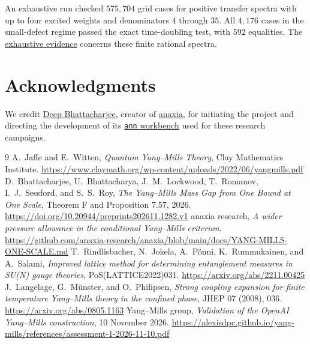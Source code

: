 \documentclass[11pt]{amsart}
\begin{document}
An exhaustive run checked \(575{,}704\) grid cases for positive transfer
spectra with up to four excited weights and denominators \(4\) through \(35\).
All \(4{,}176\) cases in the small-defect regime passed the exact
time-doubling test, with \(592\) equalities. The
\href{https://github.com/anaxia-research/anaxia/blob/main/research/weak-coupling-seams/exhaustive-evidence.json}{exhaustive evidence}
concerns these finite rational spectra.

\section*{Acknowledgments}

We credit \href{https://github.com/creelie}{Deep Bhattacharjee}, creator of
\href{https://github.com/anaxia-research/anaxia}{anaxia}, for initiating the project and directing the development
of its \href{https://github.com/anaxia-research/anaxia/tree/main/anaxia/ann}{\texttt{ann} workbench}
used for these research campaigns.

\begin{thebibliography}{9}
 A.~Jaffe and E.~Witten, \emph{Quantum Yang--Mills Theory},
Clay Mathematics Institute. \url{https://www.claymath.org/wp-content/uploads/2022/06/yangmills.pdf}
 D.~Bhattacharjee, U.~Bhattacharya, J.~M.~Lockwood,
T.~Romanov, I.~J.~Sessford, and S.~S.~Roy,
\emph{The Yang--Mills Mass Gap from One Bound at One Scale},
Theorem F and Proposition 7.57, 2026.
\url{https://doi.org/10.20944/preprints202611.1282.v1}
 anaxia research,
\emph{A wider pressure allowance in the conditional Yang--Mills criterion}.
\url{https://github.com/anaxia-research/anaxia/blob/main/docs/YANG-MILLS-ONE-SCALE.md}
 T.~Rindlisbacher, N.~Jokela, A.~P\"onni, K.~Rummukainen,
and A.~Salami, \emph{Improved lattice method for determining entanglement
measures in SU(N) gauge theories}, PoS(LATTICE2022)031.
\url{https://arxiv.org/abs/2211.00425}
 J.~Langelage, G.~M\"unster, and O.~Philipsen,
\emph{Strong coupling expansion for finite temperature Yang--Mills theory
in the confined phase}, JHEP 07 (2008), 036. \url{https://arxiv.org/abs/0805.1163}
 Yang--Mills group, \emph{Validation of the OpenAI
Yang--Mills construction}, 10 November 2026.
\url{https://alexisdpc.github.io/yang-mills/references/assessment-1-2026-11-10.pdf}
\end{thebibliography}
\end{document}
